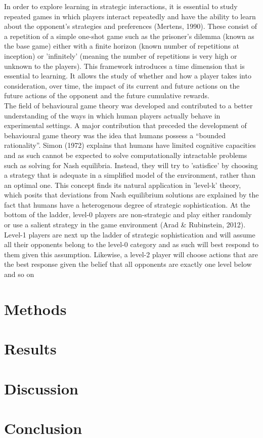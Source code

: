 \documentclass[12pt]{article}         %
\begin{document}
In order to explore learning in strategic interactions, it is essential to study repeated games in which players interact repeatedly and have the ability to learn about the opponent's strategies and preferences (Mertens, 1990). These consist of a repetition of a simple one-shot game such as the prisoner's dilemma (known as the base game) either with a finite horizon (known number of repetitions at inception) or 'infinitely' (meaning the number of repetitions is very high or unknown to the players). This framework introduces a time dimension that is essential to learning. It allows the study of whether and how a player takes into consideration, over time, the impact of its current and future actions on the future actions of the opponent and the future cumulative rewards. \\

The field of behavioural game theory was developed and contributed to a better understanding of the ways in which human players actually behave in experimental settings. A major contribution that preceded the development of behavioural game theory was the idea that humans possess a “bounded rationality”. Simon (1972) explains that humans have limited cognitive capacities and as such cannot be expected to solve computationally intractable problems such as solving for Nash equilibria. Instead, they will try to 'satisfice' by choosing a strategy that is adequate in a simplified model of the environment, rather than an optimal one. This concept finds its natural application in 'level-k' theory, which posits that deviations from Nash equilibrium solutions are explained by the fact that humans have a heterogenous degree of strategic sophistication. At the bottom of the ladder, level-0 players are non-strategic and play either randomly or use a salient strategy in the game environment (Arad & Rubinstein, 2012). Level-1 players are next up the ladder of strategic sophistication and will assume all their opponents belong to the level-0 category and as such will best respond to them given this assumption. Likewise, a level-2 player will choose actions that are the best response given the belief that all opponents are exactly one level below and so on \\


\section*{Methods}




\section*{Results}



\section*{Discussion}



\section*{Conclusion}

  
\end{document}
